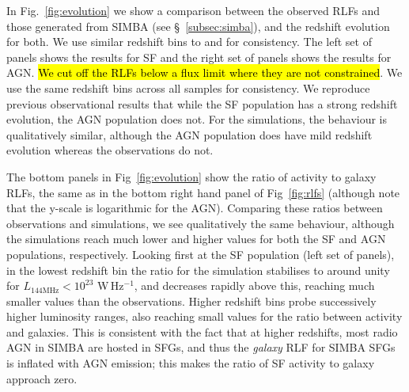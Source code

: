 \documentclass[usenatbib,fleqn,letters]{mnras}
\newcommand{\wphz}{$\,$W$\,$Hz$^{-1}$}
\newcommand{\llof}{$L_{\textrm{144MHz}}$}
\begin{document}
In Fig.~\ref{fig:evolution} we show a comparison between the observed RLFs and those generated from SIMBA (see \S~\ref{subsec:simba}), and the redshift evolution for both.  We use similar redshift bins to \cite{kondapally_cosmic_2022} and \cite{cochrane_lofar_2023} for consistency. The left set of panels shows the results for SF and the right set of panels shows the results for AGN. \hl{We cut off the RLFs below a flux limit where they are not constrained}. We use the same redshift bins across all samples for consistency. We reproduce previous observational results that while the SF population has a strong redshift evolution, the AGN population does not. For the simulations, the behaviour is qualitatively similar, although the AGN population does have mild redshift evolution whereas the observations do not.

The bottom panels in Fig~\ref{fig:evolution} show the ratio of activity to galaxy RLFs, the same as in the bottom right hand panel of Fig~\ref{fig:rlfs} (although note that the y-scale is logarithmic for the AGN). Comparing these ratios between observations and simulations, we see qualitatively the same behaviour, although the simulations reach much lower and higher values for both the SF and AGN populations, respectively. Looking first at the SF population (left set of panels), in the lowest redshift bin the ratio for the simulation stabilises to around unity for \llof $<10^{23}\,$\wphz , and decreases rapidly above this, reaching much smaller values than the observations. Higher redshift bins probe successively higher luminosity ranges, also reaching small values for the ratio between activity and galaxies. This is consistent with the fact that at higher redshifts, most radio AGN in SIMBA are hosted in SFGs, and thus the \textit{galaxy} RLF for SIMBA SFGs is inflated with AGN emission; this makes the ratio of SF activity to galaxy approach zero. 
\end{document}
